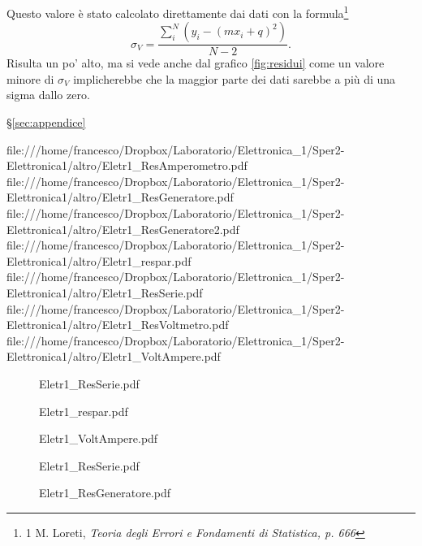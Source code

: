  Questo valore è stato calcolato direttamente dai dati con la formula\footnote{1
 M. Loreti, \itshape{Teoria degli Errori e Fondamenti di Statistica}, p. 666
}
\begin{equation}
 \sigma_V = \frac{\sum_i^N \left(y_i-(m x_i+q)^2 \right)}{N-2}.
\end{equation}
Risulta un po' alto, ma si vede anche dal grafico \autoref{fig:residui} come un
valore minore di $\sigma_V$ implicherebbe che la maggior parte dei dati sarebbe a più
di una sigma dallo zero.

\S\ref{sec:appendice}


file:///home/francesco/Dropbox/Laboratorio/Elettronica_1/Sper2-Elettronica1/altro/Eletr1_ResAmperometro.pdf
file:///home/francesco/Dropbox/Laboratorio/Elettronica_1/Sper2-Elettronica1/altro/Eletr1_ResGeneratore.pdf
file:///home/francesco/Dropbox/Laboratorio/Elettronica_1/Sper2-Elettronica1/altro/Eletr1_ResGeneratore2.pdf
file:///home/francesco/Dropbox/Laboratorio/Elettronica_1/Sper2-Elettronica1/altro/Eletr1_respar.pdf
file:///home/francesco/Dropbox/Laboratorio/Elettronica_1/Sper2-Elettronica1/altro/Eletr1_ResSerie.pdf
file:///home/francesco/Dropbox/Laboratorio/Elettronica_1/Sper2-Elettronica1/altro/Eletr1_ResVoltmetro.pdf
file:///home/francesco/Dropbox/Laboratorio/Elettronica_1/Sper2-Elettronica1/altro/Eletr1_VoltAmpere.pdf
\begin{figure}[0.7\textwidth]
 \centering 
  
 \caption{Eletr1_ResSerie.pdf} 
 \label{gr:02_graph_4.tex}
\end{figure}

\begin{figure}[0.7\textwidth]
 \centering 
  
 \caption{Eletr1_respar.pdf} 
 \label{gr:02_graph_4.tex}
\end{figure}

\begin{figure}[0.7\textwidth]
 \centering 
  
 \caption{Eletr1_VoltAmpere.pdf} 
 \label{gr:02_graph_4.tex}
\end{figure}

\begin{figure}[0.7\textwidth]
 \centering 
  
 \caption{Eletr1_ResSerie.pdf} 
 \label{gr:02_graph_4.tex}
\end{figure}\begin{figure}[0.7\textwidth]
 \centering 
  
 \caption{Eletr1_ResGeneratore.pdf} 
 \label{gr:02_graph_4.tex}
\end{figure}

